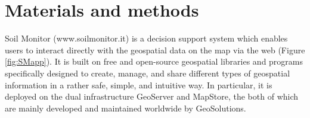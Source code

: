 \documentclass[APA,LATO1COL,doublespace]{WileyNJD-v2}
\begin{document}
\section{Materials and methods} \label{sec:MatMet}
Soil Monitor (www.soilmonitor.it) is a decision support system which enables users to interact directly with the geospatial data on the map via the web (Figure \ref{fig:SMapp}).
It is built on free and open-source geospatial libraries and programs specifically designed to create, manage, and share different types of geospatial information in a rather safe, simple, and intuitive way.
In particular, it is deployed on the dual infrastructure GeoServer and MapStore, the both of which are mainly developed and maintained worldwide by GeoSolutions.
\end{document}
